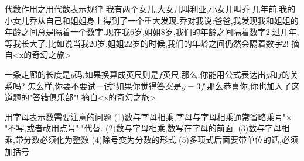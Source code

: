 代数作用之用代数表示规律
我有两个女儿,大女儿叫利亚,小女儿叫乔.几年前,我的小女儿乔从自己和姐姐身上得到了一个重大发现.乔对我说:爸爸,我发现我和姐姐的年龄之间总是隔着一个数字.现在我6岁,姐姐8岁,我们的年龄之间隔着数字2.过几年,等我长大了,比如说当我20岁,姐姐22岁的时候,我们的年龄之间仍然会隔着数字2!
    摘自<x的奇幻之旅>

一条走廊的长度是$y$码,如果换算成英尺则是$f$英尺.那么,你能用公式表达出$y$和$f$的关系吗?
怎么样,你要不要试一试?如果你觉得答案是$y=3f$,那么恭喜你,你也加入了这道题的"答错俱乐部"!
    摘自<x的奇幻之旅>

用字母表示数需要注意的问题
(1)数与字母相乘,字母与字母相乘通常省略乘号"$\times$"不写,或者改用点号"$\cdot$"代替.
(2)数与字母相乘,数写在字母的前面.
(3)数与字母相乘,带分数必须化为整数
(4)除号变为分数的形式
(5)多项式后面要带单位的话,必须加括号


